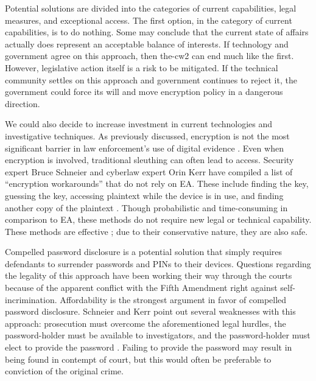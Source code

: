 \documentclass{IEEEtran}
\begin{document}
Potential solutions are divided into the categories of current capabilities, legal measures, and exceptional access. The
first option, in the category of current capabilities, is to do nothing. Some may conclude that the current state of
affairs actually does represent an acceptable balance of interests. If technology and government agree on this approach,
then \ac{the-cw2} can end much like the first. However, legislative action itself is a risk to be mitigated. If the
technical community settles on this approach and government continues to reject it, the government could force its will
and move encryption policy in a dangerous direction.

We could also decide to increase investment in current technologies and investigative techniques. As previously
discussed, encryption is not the most significant barrier in law enforcement's use of digital evidence
\cite{carter_2018}. Even when encryption is involved, traditional sleuthing can often lead to access. Security expert
Bruce Schneier and cyberlaw expert Orin Kerr have compiled a list of ``encryption workarounds'' that do not rely on
\ac{EA}. These include finding the key, guessing the key, accessing plaintext while the device is in use, and finding
another copy of the plaintext \cite{kerr_encryption_2017}. Though probabilistic and time-consuming in comparison to
\ac{EA}, these methods do not require new legal or technical capability. These methods are effective
\cite{greenberg_2018}; due to their conservative nature, they are also safe.

Compelled password disclosure is a potential solution that simply requires defendants to surrender passwords and
\acp{PIN} to their devices. Questions regarding the legality of this approach have been working their way through the
courts \cite{bittenbender_2019} \cite{sobel_2019} because of the apparent conflict with the Fifth Amendment right
against self-incrimination. Affordability is the strongest argument in favor of compelled password disclosure. Schneier
and Kerr point out several weaknesses with this approach: prosecution must overcome the aforementioned legal hurdles,
the password-holder must be available to investigators, and the password-holder must elect to provide the password
\cite{kerr_encryption_2017}. Failing to provide the password may result in being found in contempt of court, but this
would often be preferable to conviction of the original crime.
\end{document}
